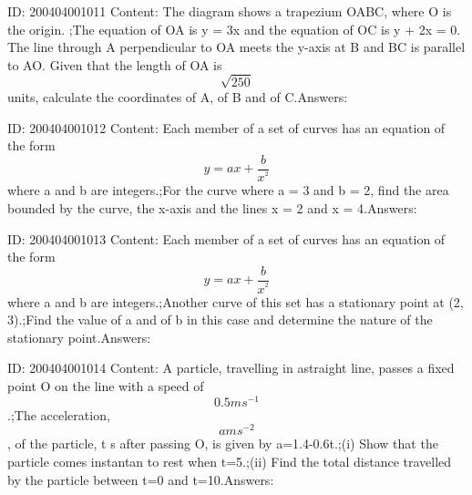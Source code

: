 \documentclass{article}
\begin{document}
ID: 200404001011
Content:
The diagram shows a trapezium OABC, where O is the origin. ;The equation of OA is y = 3x and the equation of OC is y + 2x = 0. The line through A perpendicular to OA meets the y-axis at B and BC is parallel to AO. Given that the length of OA is $$\sqrt{250}$$ units, calculate the coordinates of A, of B and of C.Answers:

ID: 200404001012
Content:
Each member of a set of curves has an equation of the form $$y=ax+\frac{b}{x^{^{2}}}$$ where a and b are integers.;For the curve where a = 3 and b = 2, find the area bounded by the curve, the x-axis and the lines x = 2 and x = 4.Answers:

ID: 200404001013
Content:
Each member of a set of curves has an equation of the form $$y=ax+\frac{b}{x^{^{2}}}$$ where a and b are integers.;Another curve of this set has a stationary point at (2, 3).;Find the value of a and of b in this case and determine the nature of the stationary point.Answers:

ID: 200404001014
Content:
A particle, travelling in astraight line, passes a fixed point O on the line with a speed of $$0.5ms^{-1}$$.;The acceleration, $$ams^{-2}$$, of the particle, t s after passing O, is given by a=1.4-0.6t.;(i)	Show that the particle comes instantan to rest when t=5.;(ii)	Find the total distance travelled by the particle between t=0 and t=10.Answers:
\end{document}
